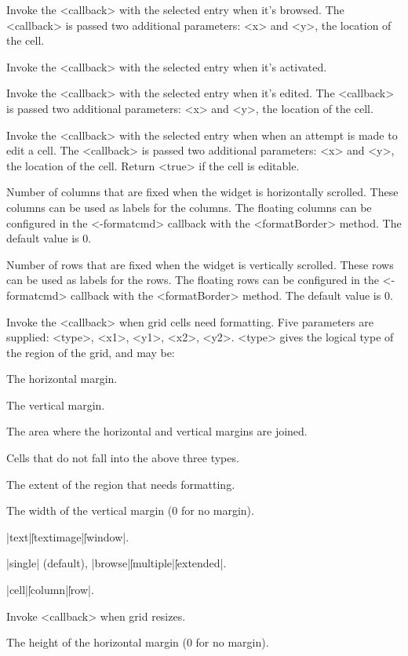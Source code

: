 \vskip5pt
\begin{enum}{1cm}

 Invoke the <callback> with the selected entry
when it's browsed. The <callback> is passed two additional parameters: <x> and <y>, 
the location of the cell.

 Invoke the <callback> with the selected entry
when it's activated.

 Invoke the <callback> with the selected entry
when it's edited. The <callback> is passed two additional parameters: <x> and <y>, 
the location of the cell.

Invoke the <callback> with the selected entry
when when an attempt is made to edit a cell. The <callback> is passed two additional parameters: <x> and <y>, 
the location of the cell.  Return <true> if the cell is editable.

Number of columns that are fixed when the widget
is horizontally scrolled.  These columns
can be used as labels for the columns.  The floating columns
can be configured in the <-formatcmd> callback with the
<formatBorder> method.  The default value is 0.

Number of rows that are fixed when the widget
is vertically scrolled.  These rows
can be used as labels for the rows.  The floating rows
can be configured in the <-formatcmd> callback with the
<formatBorder> method.  The default value is 0.

Invoke the <callback> when grid cells need  formatting.
Five parameters are supplied: <type>, <x1>, <y1>, <x2>, <y2>. <type> gives the
logical type of the region of the grid, and may be:

 The horizontal margin.

 The vertical margin.

 The area where the horizontal and vertical margins are joined.

 Cells that do not fall into the above three types.

 The extent of the region that needs formatting.

The width of the vertical margin (0 for no margin).

|text|\||textimage|\||window|.

|single| (default), |browse|\||multiple|\||extended|.

|cell|\||column|\||row|.

Invoke <callback> when grid resizes.

The height of the horizontal margin (0 for no margin).
\end{enum}


